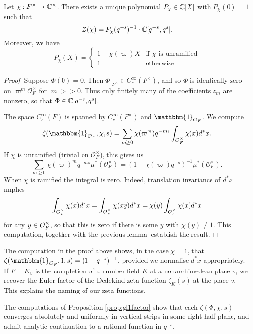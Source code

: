 \begin{prop}\label{prop:gl1factor}
    Let $\chi:F^\times \to \mathbb{C}^\times$. There exists a unique polynomial $P_\chi \in \mathbb{C}[X]$ with $P_\chi(0)=1$ such that
    $$\mathcal Z(\chi) = P_\chi(q^{-s})^{-1}\cdot \mathbb{C}[q^{-s},q^s].$$
    Moreover, we have
    $$
    P_\chi(X) =
    \begin{cases}
        1-\chi(\varpi)X & \text{if $\chi$ is unramified} \\
        1 & \text{otherwise}
    \end{cases}
    $$
\end{prop}
\begin{proof}
    Suppose $\Phi(0)=0$. Then $\Phi|_{F^\times} \in C_c^\infty(F^\times)$, and so $\Phi$ is identically zero on $\varpi^m\mathcal O_F^\times$ for $|m| >>0$. Thus only finitely many of the coefficients $z_m$ are nonzero, so that $\Phi \in \mathbb{C}[q^{-s},q^s]$.

    The space $C_c^\infty(F)$ is spanned by $C_c^\infty(F^\times)$ and $\mathbbm{1}_{\mathcal O_F}$. We compute
    $$\zeta(\mathbbm{1}_{\mathcal O_F},\chi,s) = \sum\limits_{m \geq 0} \chi(\varpi^m)q^{-ms} \int_{\mathcal O_F^\times} \chi(x)d^*x.$$
    If $\chi$ is unramified (trivial on $\mathcal O_F^\times$), this gives us 
    $$\sum\limits_{m \geq 0} \chi(\varpi)^mq^{-ms} \mu^*(\mathcal O_F^\times) = (1-\chi(\varpi)q^{-s})^{-1} \mu^*(\mathcal O_F^\times).$$
    When $\chi$ is ramified the integral is zero. Indeed, translation invariance of $d^*x$ implies
    $$\int_{\mathcal O_F^\times} \chi(x)d^*x = \int_{\mathcal O_F^\times} \chi(xy)d^*x = \chi(y)\int_{\mathcal{O}_F^\times} \chi(x) d^*x$$ for any $y \in \mathcal{O}_F^\times$, so that this is zero if there is some $y$ with $\chi(y) \neq 1$. This computation, together with the previous lemma, establish the result. 
\end{proof}

\begin{rem}
    The computation in the proof above shows, in the case $\chi = 1$, that $\zeta(\mathbbm{1}_{\cO_F},1,s) = (1-q^{-s})^{-1}$, provided we normalise $d^*x$ appropriately. If $F=K_v$ is the completion of a number field $K$ at a nonarchimedean place $v$, we recover the Euler factor of the Dedekind zeta function $\zeta_K(s)$ at the place $v$. This explains the naming of our zeta functions. 
\end{rem}

\begin{rem}
    The computations of Proposition \ref{prop:gl1factor} show that each $\zeta(\Phi,\chi,s)$ converges absolutely and uniformly in vertical strips in some right half plane, and admit analytic continuation to a rational function in $q^{-s}$.
\end{rem}

